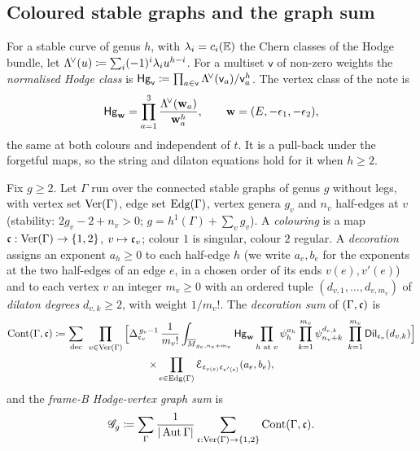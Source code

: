 \subsection{Coloured stable graphs and the graph sum}
\label{sec:set-graphsum}

For a stable curve of genus $h$, with $\lambda_i=c_i(\mathbb{E})$ the Chern classes of the Hodge bundle, let $\Lambda^{\!\vee}(u)\coloneqq\sum_i(-1)^i\lambda_iu^{h-i}$. For a multiset $\mathsf{v}$ of non-zero weights the \emph{normalised Hodge class} is $\mathsf{Hg}_{\mathsf{v}}\coloneqq\prod_{a\in\mathsf{v}}\Lambda^{\!\vee}(\mathsf{v}_a)/\mathsf{v}_a^{h}$. The vertex class of the note is
\begin{equation}
\label{eq:set-Hg}
\mathsf{Hg}_{\mathbf{w}}=\prod_{a=1}^{3}\frac{\Lambda^{\!\vee}(\mathbf{w}_a)}{\mathbf{w}_a^{h}},\qquad \mathbf{w}=(E,-\epsilon_1,-\epsilon_2),
\end{equation}
the same at both colours and independent of $t$. It is a pull-back under the forgetful maps, so the string and dilaton equations hold for it when $h\geq2$.

\begin{defn}
\label{def:set-graphsum}
Fix $g\geq2$. Let $\Gamma$ run over the connected stable graphs of genus $g$ without legs, with vertex set $\mathrm{Ver}(\Gamma)$, edge set $\mathrm{Edg}(\Gamma)$, vertex genera $g_v$ and $n_v$ half-edges at $v$ (stability: $2g_v-2+n_v>0$; $g=h^1(\Gamma)+\sum_vg_v$). A \emph{colouring} is a map $\mathfrak{c}:\mathrm{Ver}(\Gamma)\to\{1,2\}$, $v\mapsto\mathfrak{c}_v$; colour $1$ is singular, colour $2$ regular. A \emph{decoration} assigns an exponent $a_h\geq0$ to each half-edge $h$ (we write $a_e,b_e$ for the exponents at the two half-edges of an edge $e$, in a chosen order of its ends $v(e),v'(e)$) and to each vertex $v$ an integer $m_v\geq0$ with an ordered tuple $(d_{v,1},\ldots,d_{v,m_v})$ of \emph{dilaton degrees} $d_{v,k}\geq2$, with weight $1/m_v!$. The \emph{decoration sum} of $(\Gamma,\mathfrak{c})$ is
\begin{multline}
\label{eq:set-graphsum}
\GCont(\Gamma,\col)\coloneqq\sum_{\mathrm{dec}}\ \prod_{v\in\Ver(\Gamma)}\Big[\Delta_{\col_v}^{\,g_v-1}\,\frac{1}{m_v!}\int_{\Mbar_{g_v,n_v+m_v}}\Hg_{\bw}\prod_{h\text{ at }v}\psi_h^{a_h}\prod_{k=1}^{m_v}\psi_{n_v+k}^{d_{v,k}}\ \prod_{k=1}^{m_v}\Dil_{\col_v}(d_{v,k})\Big]\\
\times\prod_{e\in\Edg(\Gamma)}\Edge_{\col_{v(e)}\col_{v'(e)}}(a_e,b_e),
\end{multline}
and the \emph{frame-B Hodge-vertex graph sum} is
\begin{equation}
\label{eq:set-Gsum}
\mathscr{G}_g\coloneqq\sum_{\Gamma}\frac{1}{|\operatorname{Aut}\Gamma|}\sum_{\mathfrak{c}:\mathrm{Ver}(\Gamma)\to\{1,2\}}\mathrm{Cont}(\Gamma,\mathfrak{c}).
\end{equation}
\end{defn}

